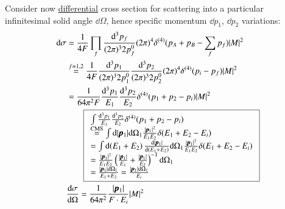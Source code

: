 Consider now \underline{differential} cross section for scattering into a particular infinitesimal solid angle $\dd \Omega$, hence specific momentum $\dd p_1$, $\dd p_2$ variations:
\begin{align}
	\dd \sigma &= \frac{1}{4F}\prod_f \frac{\dd^3 p_f}{(2\pi)^3 2p_f^0} (2\pi)^4 \delta^{(4)}(p_A+p_B-\sum_f p_f)|M|^2 \notag \\
			   &\stackrel{f=1,2}{=}  \frac{1}{4F} \frac{\dd^3 p_1}{(2\pi)^3 2p_1^0} \frac{\dd^3 p_2}{(2\pi)^3 2p_2^0} (2\pi)^4 \delta^{(4)}(p_i- p_f)|M|^2 \notag\\
			   &= \frac{1}{64\pi^2 F} \frac{\dd^3 p_1}{E_1} \frac{\dd^3 p_2}{E_2} \delta^{(4)}(p_1 + p_2 - p_i) |M|^2 \notag\\
			   &\qquad \boxed{ 
				   \begin{array}{ll}
				   \int \frac{\dd^3 p_1}{E_1} \frac{\dd^3 p_2}{E_2} \delta^{(4)}(p_1 + p_2 - p_i)  \\ 
				   \stackrel{\text{CMS}}{=} \int \dd |\pmb{p}_1| \dd \Omega_1 \frac{|\pmb{p}_1|^2}{E_1 E_2} \delta (E_1 + E_2 -E_i) \\
				   = \int \dd (E_1 + E_2) \frac{\dd |\pmb{p}_1|}{\dd (E_1 + E_2)} \dd \Omega_1 \frac{|\pmb{p}_1|^2}{E_1 E_2} \delta (E_1 + E_2 -E_i)   \\
				   = \frac{|\pmb{p}_1|^2}{E_1 E_2} \left( \frac{|\pmb{p}_1|}{E_1} + \frac{|\pmb{p}_1|}{E_2} \right)^{-1} \dd \Omega_1 \\
				   = \frac{|\pmb{p}_1|\dd \Omega_1}{E_1 + E_2} =  \frac{|\pmb{p}_1|\dd \Omega_1}{E_i}
				   \end{array}
			   } \notag \\
			   &\frac{\dd \sigma}{\dd \Omega} = \frac{1}{64 \pi^2} \frac{|\pmb{p}_1|}{F\cdot E_i} |M|^2	
\end{align}

